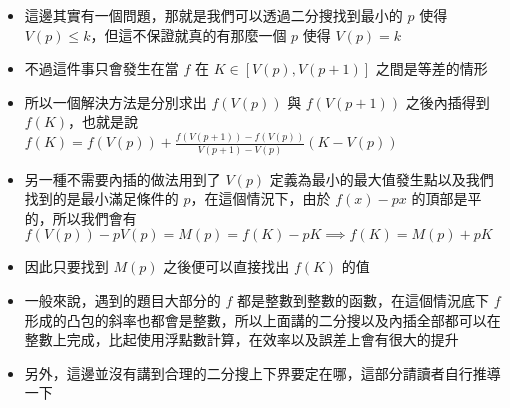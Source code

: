 \documentclass[standalone]{beamer}
\begin{document}
\begin{frame}{}
  \begin{itemize}
    \item 這邊其實有一個問題，那就是我們可以透過二分搜找到最小的 $p$ 使得 $V(p) \leq k$，但這不保證就真的有那麼一個 $p$ 使得 $V(p) = k$
    \item 不過這件事只會發生在當 $f$ 在 $K \in [V(p), V(p + 1)]$ 之間是等差的情形
    \item 所以一個解決方法是分別求出 $f(V(p))$ 與 $f(V(p + 1))$ 之後內插得到 $f(K)$，也就是說 $f(K) = f(V(p)) + \frac{f(V(p + 1)) - f(V(p))}{V(p + 1) - V(p)}\left(K - V(p)\right)$
\end{itemize}
\end{frame}
\begin{frame}{}
\begin{itemize}
    \item 另一種不需要內插的做法用到了 $V(p)$ 定義為最小的最大值發生點以及我們找到的是最小滿足條件的 $p$，在這個情況下，由於 $f(x) - px$ 的頂部是平的，所以我們會有 $f(V(p)) - pV(p) = M(p) = f(K) - pK \implies f(K) = M(p) + pK$
    \item 因此只要找到 $M(p)$ 之後便可以直接找出 $f(K)$ 的值
    \item 一般來說，遇到的題目大部分的 $f$ 都是整數到整數的函數，在這個情況底下 $f$ 形成的凸包的斜率也都會是整數，所以上面講的二分搜以及內插全部都可以在整數上完成，比起使用浮點數計算，在效率以及誤差上會有很大的提升
    \item 另外，這邊並沒有講到合理的二分搜上下界要定在哪，這部分請讀者自行推導一下
  \end{itemize}
\end{frame}
\end{document}
